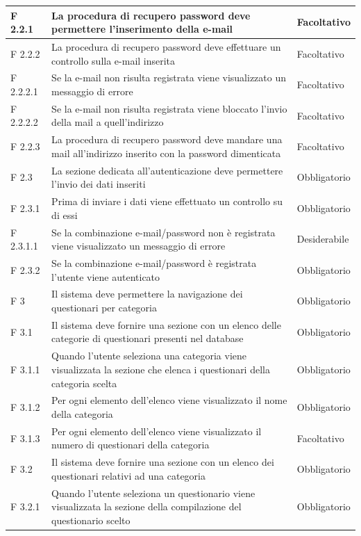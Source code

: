 \documentclass[a4paper,11pt]{article}
\begin{document}
\begin{longtable}{p{}p{}p{}}
\midrule
F 2.2.1 & La procedura di recupero password deve permettere l'inserimento della e-mail & Facoltativo\\
\midrule
F 2.2.2 & La procedura di recupero password deve effettuare un controllo sulla e-mail inserita & Facoltativo\\
\midrule
F 2.2.2.1 & Se la e-mail non risulta registrata viene visualizzato un messaggio di errore & Facoltativo\\
\midrule
F 2.2.2.2 & Se la e-mail non risulta registrata viene bloccato l'invio della mail a quell'indirizzo & Facoltativo\\
\midrule
F 2.2.3 & La procedura di recupero password deve mandare una mail all'indirizzo inserito con la password dimenticata & Facoltativo\\
\midrule
F 2.3 & La sezione dedicata all'autenticazione deve permettere l'invio dei dati inseriti & Obbligatorio\\
\midrule
F 2.3.1 & Prima di inviare i dati viene effettuato un controllo su di essi & Obbligatorio\\
\midrule
F 2.3.1.1 & Se la combinazione e-mail/password non è registrata viene visualizzato un messaggio di errore & Desiderabile\\
\midrule
F 2.3.2 & Se la combinazione e-mail/password è registrata l'utente viene autenticato & Obbligatorio\\
\midrule
F 3 & Il sistema deve permettere la navigazione dei questionari per categoria & Obbligatorio\\
\midrule
F 3.1 & Il sistema deve fornire una sezione con un elenco delle categorie di questionari presenti nel database & Obbligatorio\\
\midrule
F 3.1.1 & Quando l'utente seleziona una categoria viene visualizzata la sezione che elenca i questionari della categoria scelta & Obbligatorio\\
\midrule
F 3.1.2 & Per ogni elemento dell'elenco viene visualizzato il nome della categoria & Obbligatorio\\
\midrule
F 3.1.3 & Per ogni elemento dell'elenco viene visualizzato il numero di questionari della categoria & Facoltativo\\
\midrule
F 3.2 & Il sistema deve fornire una sezione con un elenco dei questionari relativi ad una categoria & Obbligatorio\\
\midrule
F 3.2.1 & Quando l'utente seleziona un questionario viene visualizzata la sezione della compilazione del questionario scelto & Obbligatorio\\

\end{longtable}
\end{document}
